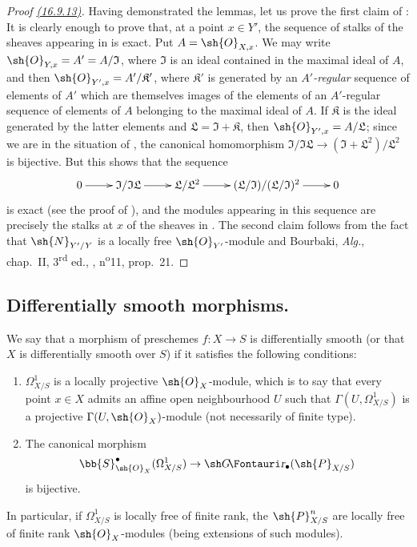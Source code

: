 \begin{proof}[Proof {\hyperlink{ega4.c04.prop.16-9-13}{(16.9.13)}}]
Having demonstrated the lemmas, let us prove the first claim of :
It is clearly
enough to prove that, at a point $x \in Y'$, the sequence of stalks of the sheaves appearing in  is exact.
Put $A = \sh{O}_{X,x}$. We may write $\sh{O}_{Y,x} = A' = A/\mathfrak{I}$, where $\mathfrak{I}$ is an ideal contained in the maximal ideal of $A$, and then $\sh{O}_{Y',x} = A'/\mathfrak{K}'$, where $\mathfrak{K}'$ is generated by an \emph{$A'$-regular} sequence of elements of $A'$ which are themselves images of the elements of an $A'$-regular sequence of elements of $A$ belonging to the maximal ideal of $A$.
If $\mathfrak{K}$ is the ideal generated by the latter elements and $\mathfrak{L} = \mathfrak{I} + \mathfrak{K}$, then $\sh{O}_{Y',x} = A/\mathfrak{L}$; since we are in the situation of , the canonical homomorphism $\mathfrak{I}/\mathfrak{I}\mathfrak{L} \to (\mathfrak{I} + \mathfrak{L}^2)/\mathfrak{L}^2$ is bijective.
But this shows that the sequence
\[
  \xymatrix{
    0 \ar[r] & \mathfrak{I}/\mathfrak{I}\mathfrak{L} \ar[r] & \mathfrak{L}/\mathfrak{L}^2 \ar[r] &  (\mathfrak{L}/\mathfrak{I})/(\mathfrak{L}/\mathfrak{I})^2 \ar[r] & 0
  }
\]
is exact (see the proof of ), and the modules appearing in this sequence are precisely the stalks at $x$ of the sheaves in .
The second claim follows from the fact that $\sh{N}_{Y'/Y}$ is a locally free $\sh{O}_{Y'}$-module  and Bourbaki, \emph{Alg.}, chap.~II, 3\textsuperscript{rd} ed., , n\textsuperscript{o}11, prop.\ 21.
\end{proof}

\subsection{Differentially smooth morphisms.}
\label{IV.16.10}

\begin{definition}[16.10.1]
\label{IV.16.10.1}
We say that a morphism of preschemes $f: X \to S$ is differentially smooth (or that $X$ is differentially smooth over $S$) if it satisfies the following conditions:
\begin{enumerate}
  \item[\rm{(i)}] $\Omega_{X/S}^1$ is a locally projective $\sh{O}_X$-module, which is to say that every point $x \in X$ admits an affine open neighbourhood $U$ such that $\Gamma(U, \Omega_{X/S}^1)$ is a projective $\Gamma(U, \sh{O}_X)$-module (not necessarily of finite type).
  \item[\rm{(ii)}] The canonical morphism 
  \[
    \bb{S}_{\sh{O}_X}^\bullet(\Omega_{X/S}^1) \to \shGr_\bullet(\sh{P}_{X/S})
  \]
  is bijective.
\end{enumerate}

In particular, if $\Omega_{X/S}^1$ is locally free of finite rank, the $\sh{P}_{X/S}^n$ are locally free of finite rank $\sh{O}_X$-modules (being extensions of such modules).
\end{definition}

